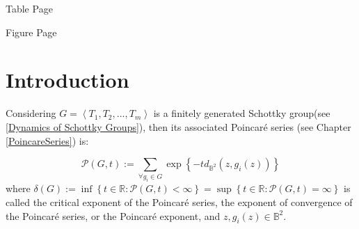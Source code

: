 \documentclass[12pt,oneside]{sfsuthesis}
\theoremstyle{plain} %
\theoremstyle{definition}  %
\theoremstyle{remark}  %
\theoremstyle{plain}
\begin{document}
{\newpage \tableofcontents 
\newpage Table \hfill Page \listoftables %
\newpage Figure \hfill Page \listoffigures %

\newpage
\pagestyle{myheadings}
\setcounter{page}{1}


%

\chapter{Introduction}


Considering $G=\left\langle T_1, T_2,...,T_m\right\rangle$ is a finitely generated Schottky group(see \ref{Dynamics of Schottky Groups}), then its associated Poincar\'{e} series (see Chapter \ref{PoincareSeries}) is: 

$$
\mathcal{P}(G,t):=\sum\limits_{\forall g_i\in G}\exp\left\lbrace -td_{\mathbb{B}^2}(z,g_i(z)) \right\rbrace
$$
where $\delta(G):=\inf\left\lbrace t\in\mathbb{R}:\mathcal{P}(G,t)<\infty \right\rbrace = \sup\left\lbrace t\in\mathbb{R}:\mathcal{P}(G,t)=\infty\right\rbrace$ is called the critical exponent of the Poincar\'{e} series, the exponent of convergence of the Poincar\'{e} series, or the Poincar\'{e} exponent, and $z,g_i(z)\in \mathbb{B}^2$. 

}
\end{document}
